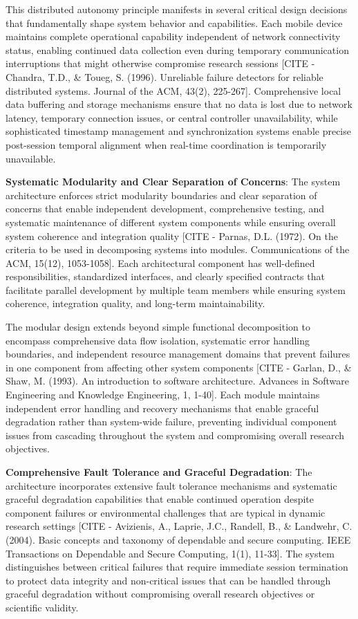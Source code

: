 \documentclass[11pt,a4paper]{report}
\begin{document}
This distributed autonomy principle manifests in several critical design decisions that fundamentally shape system
behavior and capabilities. Each mobile device maintains complete operational capability independent of network
connectivity status, enabling continued data collection even during temporary communication interruptions that might
otherwise compromise research
sessions [CITE - Chandra, T.D., \& Toueg, S. (1996). Unreliable failure detectors for reliable distributed systems. Journal of the ACM, 43(2), 225-267].
Comprehensive local data buffering and storage mechanisms ensure that no data is lost due to network latency, temporary
connection issues, or central controller unavailability, while sophisticated timestamp management and synchronization
systems enable precise post-session temporal alignment when real-time coordination is temporarily unavailable.

\textbf{Systematic Modularity and Clear Separation of Concerns}: The system architecture enforces strict modularity
boundaries and clear separation of concerns that enable independent development, comprehensive testing, and systematic
maintenance of different system components while ensuring overall system coherence and integration
quality [CITE - Parnas, D.L. (1972). On the criteria to be used in decomposing systems into modules. Communications of the ACM, 15(12), 1053-1058].
Each architectural component has well-defined responsibilities, standardized interfaces, and clearly specified contracts
that facilitate parallel development by multiple team members while ensuring system coherence, integration quality, and
long-term maintainability.

The modular design extends beyond simple functional decomposition to encompass comprehensive data flow isolation,
systematic error handling boundaries, and independent resource management domains that prevent failures in one component
from affecting other system
components [CITE - Garlan, D., \& Shaw, M. (1993). An introduction to software architecture. Advances in Software Engineering and Knowledge Engineering, 1, 1-40].
Each module maintains independent error handling and recovery mechanisms that enable graceful degradation rather than
system-wide failure, preventing individual component issues from cascading throughout the system and compromising
overall research objectives.

\textbf{Comprehensive Fault Tolerance and Graceful Degradation}: The architecture incorporates extensive fault tolerance
mechanisms and systematic graceful degradation capabilities that enable continued operation despite component failures
or environmental challenges that are typical in dynamic research
settings [CITE - Avizienis, A., Laprie, J.C., Randell, B., \& Landwehr, C. (2004). Basic concepts and taxonomy of dependable and secure computing. IEEE Transactions on Dependable and Secure Computing, 1(1), 11-33].
The system distinguishes between critical failures that require immediate session termination to protect data integrity
and non-critical issues that can be handled through graceful degradation without compromising overall research
objectives or scientific validity.
\end{document}
